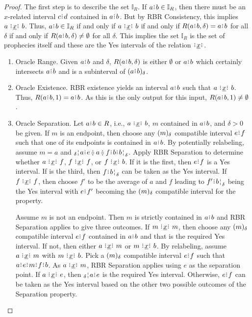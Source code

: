 \documentclass[12pt]{article}
\begin{document}
\begin{proof}

    The first step is to describe the set $\mathbb{I}_R$. If $a\rint b \in \mathbb{I}_R$, then there must be an $x$-related interval $c\rint d$ contained in $a\rint b$. But by RBR Consistency, this implies $a \xrel b$. Thus, $a\rint b \in \mathbb{I}_R$ if and only if $a \xrel b$ if and only if $R(a\rint b, \delta) = a\rint b$ for all $\delta$ if and only if $R(a\rint b, \delta) \neq \emptyset$ for all $\delta$. This implies the set $\mathbb{I}_R$ is the set of prophecies itself and these are the Yes intervals of the relation $\xrel$. 

    \begin{enumerate}
        \item Oracle Range. Given $a\rint b$ and $\delta$, $R(a\rint b, \delta)$ is either $\emptyset$ or $a\rint b$ which certainly intersects $a\rint b$ and is a subinterval  of $\halo{a\rint b}$.
        \item Oracle Existence. RBR existence yields an interval $a\rint b$ such that $a \xrel b$. Thus, $R(a\rint b, 1) = a\rint b$. As this is the only output for this input, $R(a\rint b, 1) \neq \emptyset$. 
        \item Oracle Separation. Let $a\rint b \in R$, i.e., $a \xrel b$, $m$ contained in $a\rint b$, and $\delta >0$ be given. If $m$ is an endpoint, then choose any $(m)_{\delta}$ compatible interval $e\rint f$ such that one of its endpoints is contained in $a\rint b$. By potentially relabeling, assume $m =a$ and $\fuzbleft{a} \rint e\betneq a \betneq f\rint b\rint \fuzbright{b}$. Apply RBR Separation to determine whether $a \xrel f$, $f \xrel f$, or $f \xrel b$. If it is the first, then $e\rint f$ is a Yes interval. If is the third, then $f\rint \fuzbright{b}$ can be taken as the Yes interval. If $f \xrel f$, then choose $f'$ to be the average of $a$ and $f$ leading to $f'\rint \fuzbright{b}$ being the Yes interval with $e\rint f'$ becoming the $(m)_{\delta}$ compatible interval for the property. 

        Assume $m$ is not an endpoint. Then $m$ is strictly contained in $a\rint b$ and RBR Separation applies to give three outcomes. If $m \xrel m$, then choose any $(m)_{\delta}$ compatible interval $e\rint f$  contained in $a\rint b$ and that is the required Yes interval. If not, then either $a \xrel m$ or $m \xrel b$. By relabeling, assume $a \xrel m$ with \sout{$m \xrel b$}. Pick a $(m)_{\delta}$ compatible interval $e\rint f$ such that $a\rint e\rint m\rint f\rint b$. As $a \xrel m$, RBR Separation applies using $e$ as the separation point. If $a \xrel e$, then $\fuzbleft{a} \rint e$ is the required Yes interval. Otherwise, $e\rint f$ can be taken as the Yes interval based on the other two possible outcomes of the Separation property. 


\end{enumerate}
\end{proof}
\end{document}
